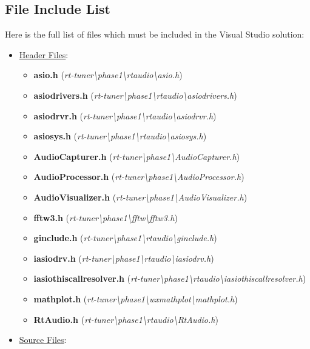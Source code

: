 \documentclass[12pt]{report}
\begin{document}
\begin{appendices}
	\section{File Include List}
	Here is the full list of files which must be included in the Visual Studio solution:
	\begin{itemize}
		\item \underline{Header Files}:
		\begin{itemize}
			\item {\bf asio.h} (\emph{rt-tuner\textbackslash phase1\textbackslash rtaudio\textbackslash asio.h})
			\item {\bf asiodrivers.h} (\emph{rt-tuner\textbackslash phase1\textbackslash rtaudio\textbackslash asiodrivers.h})
			\item {\bf asiodrvr.h} (\emph{rt-tuner\textbackslash phase1\textbackslash rtaudio\textbackslash asiodrvr.h})
			\item {\bf asiosys.h} (\emph{rt-tuner\textbackslash phase1\textbackslash rtaudio\textbackslash asiosys.h})
			\item {\bf AudioCapturer.h} (\emph{rt-tuner\textbackslash phase1\textbackslash AudioCapturer.h})
			\item {\bf AudioProcessor.h} (\emph{rt-tuner\textbackslash phase1\textbackslash AudioProcessor.h})
			\item {\bf AudioVisualizer.h} (\emph{rt-tuner\textbackslash phase1\textbackslash AudioVisualizer.h})
			\item {\bf fftw3.h} (\emph{rt-tuner\textbackslash phase1\textbackslash fftw\textbackslash fftw3.h})
			\item {\bf ginclude.h} (\emph{rt-tuner\textbackslash phase1\textbackslash rtaudio\textbackslash ginclude.h})
			\item {\bf iasiodrv.h} (\emph{rt-tuner\textbackslash phase1\textbackslash rtaudio\textbackslash iasiodrv.h})
			\item {\bf iasiothiscallresolver.h} (\emph{rt-tuner\textbackslash phase1\textbackslash rtaudio\textbackslash iasiothiscallresolver.h})
			\item {\bf mathplot.h} (\emph{rt-tuner\textbackslash phase1\textbackslash wxmathplot\textbackslash mathplot.h})
			\item {\bf RtAudio.h} (\emph{rt-tuner\textbackslash phase1\textbackslash rtaudio\textbackslash RtAudio.h})
		\end{itemize}
		\item \underline{Source Files}:
		\begin{itemize}

\end{itemize}
\end{itemize}
\end{appendices}
\end{document}
